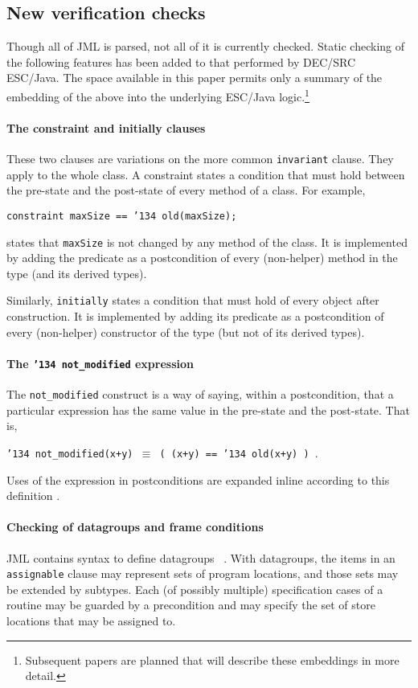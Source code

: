 \documentclass{llncs}
\begin{document}
\subsection{New verification checks}
Though all of JML is parsed, not all of it is currently checked.
Static checking of the following features has been added to that
performed by DEC/SRC ESC/Java.  The space available in this paper
permits only a summary of the embedding of the above into the
underlying ESC/Java logic.\footnote{Subsequent papers are planned that
  will describe these embeddings in more detail.}

\paragraph*{The constraint and initially clauses}
These two clauses are variations on the more common \texttt{invariant}
clause.  They apply to the whole class.  A constraint states a
condition that must hold between the pre-state and the post-state of
every method of a class.  For example,
\begin{center}
\texttt{constraint maxSize == \char'134 old(maxSize); }
\end{center}
states that \texttt{maxSize} is not changed by any method of the
class.  It is implemented by adding the predicate as a postcondition
of every (non-helper) method in the type (and its derived types).

Similarly, \texttt{initially} states a condition that must hold of
every object after construction.  It is implemented by adding its
predicate as a postcondition of every (non-helper) constructor of the
type (but not of its derived types).

\paragraph*{The \texttt{\char'134 not\_modified} expression}
The \texttt{not\_modified} construct is a way of saying, within a
postcondition, that a particular expression has the same value in the
pre-state and the post-state.  That is,
\begin{center}
\texttt{\char'134 not\_modified(x+y) $\equiv$ ( (x+y) == \char'134 old(x+y) )  }.
\end{center}
Uses of the expression in postconditions are expanded inline according
to this definition .

\paragraph*{Checking of datagroups and frame conditions}
JML contains syntax to define datagroups
~\cite{Leino-Poetzsch-Heffter-Zhou02}.  With datagroups, the items in
an \texttt{assignable} clause may represent sets of program locations,
and those sets may be extended by subtypes.  Each (of possibly
multiple) specification cases of a routine may be guarded by a
precondition and may specify the set of store locations that may be
assigned to.
\end{document}
